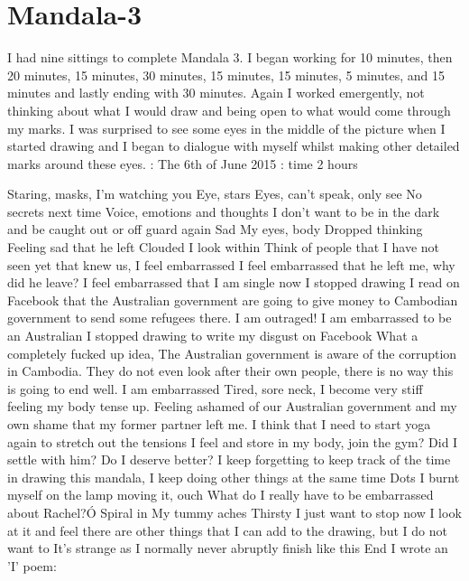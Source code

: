 \chapter{Mandala-3}



I had nine sittings to complete Mandala 3. I began working for 10 minutes, then 20 minutes, 15 minutes, 30 minutes, 15 minutes, 15 minutes, 5 minutes, and 15 minutes and lastly ending with 30 minutes. Again I worked emergently, not thinking about what I would draw and being open to what would come through my marks. I was surprised to see some eyes in the middle of the picture when I started drawing and I began to dialogue with myself whilst making other detailed marks around these eyes.   
\Date: The 6th of June 2015
\Total: time 2 hours

Staring, masks, I'm watching you
Eye, stars 
Eyes, can't speak, only see
No secrets next time
Voice, emotions and thoughts
I don't want to be in the dark and be caught out or off guard again
Sad
My eyes, body
Dropped thinking
Feeling sad that he left
Clouded
I look within
Think of people that I have not seen yet that knew us, I feel embarrassed
I feel embarrassed that he left me, why did he leave?
I feel embarrassed that I am single now
I stopped drawing 
I read on Facebook that the Australian government are going to give money to Cambodian government to send some refugees there.  
I am outraged!
I am embarrassed to be an Australian 
I stopped drawing to write my disgust on Facebook
What a completely fucked up idea, The Australian government is aware of the corruption in Cambodia. They do not even look after their own people, there is no way this is going to end well. 
I am embarrassed
Tired, sore neck, 
I become very stiff feeling my body tense up. Feeling ashamed of our Australian government and my own shame that my former partner left me. 
I think that I need to start yoga again to stretch out the tensions I feel and store in my body, join the gym?
Did I settle with him?
Do I deserve better?
I keep forgetting to keep track of the time in drawing this mandala, I keep doing other things at the same time 
Dots
I burnt myself on the lamp moving it, ouch
What do I really have to be embarrassed about Rachel?Ó
Spiral in
My tummy aches 
Thirsty
I just want to stop now
I look at it and feel there are other things that I can add to the drawing, but I do not want to
It's strange as I normally never abruptly finish like this
End
I wrote an 'I' poem:

